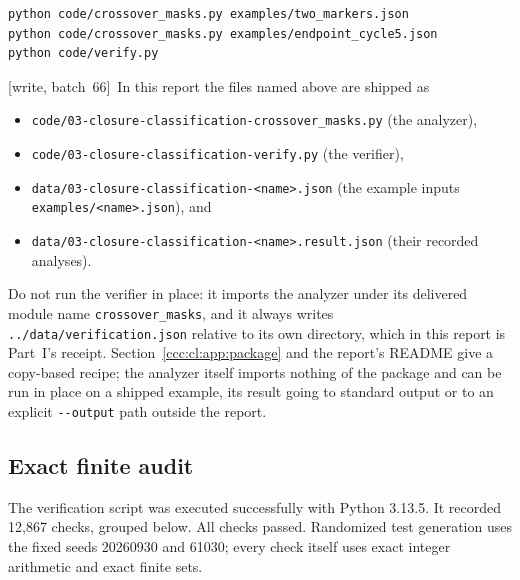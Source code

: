 \documentclass[11pt,letterpaper]{article}
\theoremstyle{definition}
\theoremstyle{remark}
\newcommand{\wsix}{\textup{[write, batch~66]}}
\begin{document}
\begin{lstlisting}
python code/crossover_masks.py examples/two_markers.json
python code/crossover_masks.py examples/endpoint_cycle5.json
python code/verify.py
\end{lstlisting}

\wsix\ In this report the files named above are shipped as
\begin{itemize}[leftmargin=1.4em,itemsep=0pt]
\item \nolinkurl{code/03-closure-classification-crossover_masks.py} (the analyzer),
\item \nolinkurl{code/03-closure-classification-verify.py} (the verifier),
\item \nolinkurl{data/03-closure-classification-<name>.json} (the example
 inputs \texttt{examples/<name>.json}), and
\item \nolinkurl{data/03-closure-classification-<name>.result.json} (their
 recorded analyses).
\end{itemize}
Do not run the
verifier in place: it imports the analyzer under its delivered module name
\texttt{crossover\_masks}, and it always writes
\nolinkurl{../data/verification.json} relative to its own directory, which in
this report is Part~I's receipt. Section~\ref{ccc:cl:app:package} and the
report's README give a copy-based recipe; the analyzer itself imports
nothing of the package and can be run in place on a shipped example, its
result going to standard output or to an explicit \texttt{-{}-output} path
outside the report.

\subsection{Exact finite audit}

The verification script was executed successfully with Python 3.13.5.
It recorded 12,867 checks, grouped below. All checks passed. Randomized
test generation uses the fixed seeds 20260930 and 61030; every check
itself uses exact integer arithmetic and exact finite sets.
\end{document}
